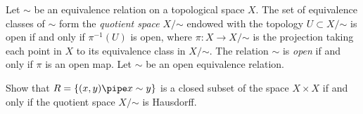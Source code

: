 Let $\sim $ be an equivalence relation on a topological space $X$. The
set of equivalence classes of $\sim $ form the \emph{quotient space}
$X/\mathord{\sim }$ endowed with the topology $U\subset
X/\mathord{\sim }$ is open if and only if $\pi^{-1}(U)$ is open, where
$\pi:X\rightarrow X/\mathord{\sim }$ is the projection taking each
point in $X$ to its equivalence class in $X/\mathord{\sim }$. The
relation $\sim $ is \emph{open} if and only if $\pi$ is an open map.
Let $\sim $ be an open equivalence relation. 

Show that $R=\{(x,y)\pipe x\sim y\}$ is a closed subset of the space
$X\times X$ if and only if the quotient space $X/\mathord{\sim }$ is
Hausdorff.
